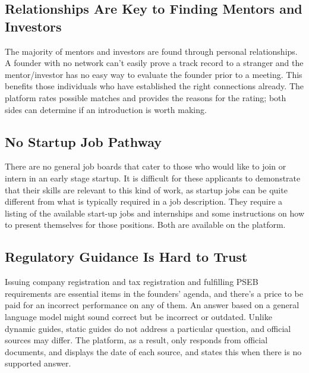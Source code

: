 \documentclass{FastFyp}
\begin{document}
\subsection{Relationships Are Key to Finding Mentors and Investors}
The majority of mentors and investors are found through personal relationships. A founder with no network can't easily prove a track record to a stranger and the mentor/investor has no easy way to evaluate the founder prior to a meeting. This benefits those individuals who have established the right connections already. The platform rates possible matches and provides the reasons for the rating; both sides can determine if an introduction is worth making.

\subsection{No Startup Job Pathway}
There are no general job boards that cater to those who would like to join or intern in an early stage startup. It is difficult for these applicants to demonstrate that their skills are relevant to this kind of work, as startup jobs can be quite different from what is typically required in a job description. They require a listing of the available start-up jobs and internships and some instructions on how to present themselves for those positions. Both are available on the platform.

\subsection{Regulatory Guidance Is Hard to Trust}
Issuing company registration and tax registration and fulfilling PSEB requirements are essential items in the founders' agenda, and there's a price to be paid for an incorrect performance on any of them. An answer based on a general language model might sound correct but be incorrect or outdated. Unlike dynamic guides, static guides do not address a particular question, and official sources may differ. The platform, as a result, only responds from official documents, and displays the date of each source, and states this when there is no supported answer.
\end{document}
